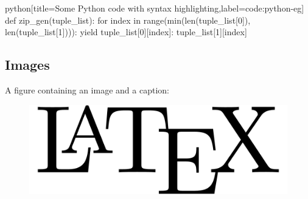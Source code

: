 \begin{code}[firstnumber=11]{python}[title={Some Python code with syntax highlighting},label=code:python-eg]
def zip_gen(tuple_list):
    for index in range(min(len(tuple_list[0]), len(tuple_list[1]))):
        yield {tuple_list[0][index]: tuple_list[1][index]}
\end{code}

\subsection{Images}

A figure containing an image and a caption:
\begin{figure}[H]
	\includegraphics[width=0.8\linewidth]{LaTeX-logo.png}
	\label{fig:latex-logo} %
\end{figure}
